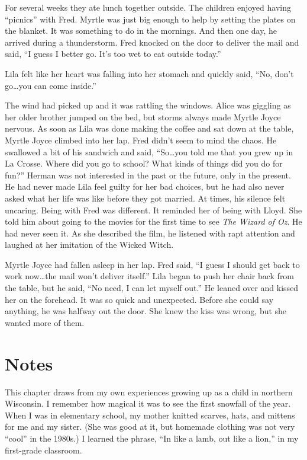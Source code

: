 \documentclass[
  letterpaper,
]{book}
\begin{document}
For several weeks they ate lunch together outside. The children enjoyed
having ``picnics'' with Fred. Myrtle was just big enough to help by
setting the plates on the blanket. It was something to do in the
mornings. And then one day, he arrived during a thunderstorm. Fred
knocked on the door to deliver the mail and said, ``I guess I better go.
It's too wet to eat outside today.''

Lila felt like her heart was falling into her stomach and quickly said,
``No, don't go\ldots you can come inside.''

The wind had picked up and it was rattling the windows. Alice was
giggling as her older brother jumped on the bed, but storms always made
Myrtle Joyce nervous. As soon as Lila was done making the coffee and sat
down at the table, Myrtle Joyce climbed into her lap. Fred didn't seem
to mind the chaos. He swallowed a bit of his sandwich and said,
``So\ldots you told me that you grew up in La Crosse. Where did you go
to school? What kinds of things did you do for fun?'' Herman was not
interested in the past or the future, only in the present. He had never
made Lila feel guilty for her bad choices, but he had also never asked
what her life was like before they got married. At times, his silence
felt uncaring. Being with Fred was different. It reminded her of being
with Lloyd. She told him about going to the movies for the first time to
see \emph{The Wizard of Oz}. He had never seen it. As she described the
film, he listened with rapt attention and laughed at her imitation of
the Wicked Witch.

Myrtle Joyce had fallen asleep in her lap. Fred said, ``I guess I should
get back to work now\ldots the mail won't deliver itself.'' Lila began
to push her chair back from the table, but he said, ``No need, I can let
myself out.'' He leaned over and kissed her on the forehead. It was so
quick and unexpected. Before she could say anything, he was halfway out
the door. She knew the kiss was wrong, but she wanted more of them.

\section{Notes}\label{notes-43}

This chapter draws from my own experiences growing up as a child in
northern Wisconsin. I remember how magical it was to see the first
snowfall of the year. When I was in elementary school, my mother knitted
scarves, hats, and mittens for me and my sister. (She was good at it,
but homemade clothing was not very ``cool'' in the 1980s.) I learned the
phrase, ``In like a lamb, out like a lion,'' in my first-grade
classroom.
\end{document}
